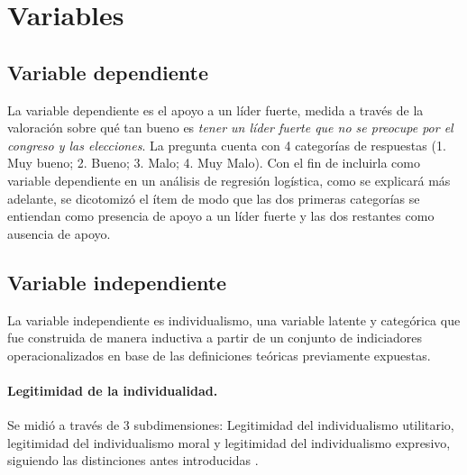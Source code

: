 \documentclass[12pt,twoside]{templates/facsothesis}
\begin{document}
\FloatBarrier

\hypertarget{variables}{%
\section{Variables}\label{variables}}

\hypertarget{variable-dependiente}{%
\subsection*{Variable dependiente}\label{variable-dependiente}}

La variable dependiente es el apoyo a un líder fuerte, medida a través de la valoración sobre qué tan bueno es \emph{tener un líder fuerte que no se preocupe por el congreso y las elecciones}. La pregunta cuenta con 4 categorías de respuestas (1. Muy bueno; 2. Bueno; 3. Malo; 4. Muy Malo). Con el fin de incluirla como variable dependiente en un análisis de regresión logística, como se explicará más adelante, se dicotomizó el ítem de modo que las dos primeras categorías se entiendan como presencia de apoyo a un líder fuerte y las dos restantes como ausencia de apoyo.

\hypertarget{variable-independiente}{%
\subsection*{Variable independiente}\label{variable-independiente}}

La variable independiente es individualismo, una variable latente y categórica que fue construida de manera inductiva a partir de un conjunto de indiciadores operacionalizados en base de las definiciones teóricas previamente expuestas.

\hypertarget{legitimidad-de-la-individualidad.}{%
\paragraph*{Legitimidad de la individualidad.}\label{legitimidad-de-la-individualidad.}}

Se midió a través de 3 subdimensiones: Legitimidad del individualismo utilitario, legitimidad del individualismo moral y legitimidad del individualismo expresivo, siguiendo las distinciones antes introducidas \citep{cortois2018}.
\end{document}
